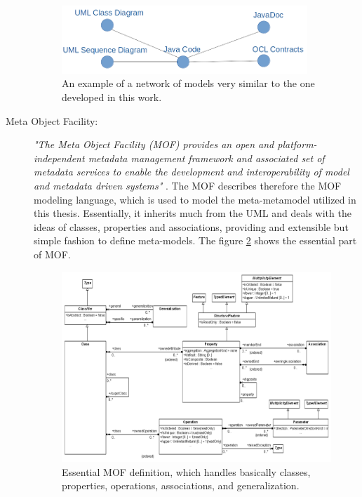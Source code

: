 \documentclass[tuberlin,cic,tc,english,noabntcite]{iiufrgs}
\begin{document}
\begin{description}
	\begin{figure}[h]
	    \caption{An example of a network of models very similar to the one developed in this work.}
	    \begin{center}
	        \includegraphics[width=25em]{network_example_01}   
	    \end{center}
	    \label{fig:network_example_01}
	\end{figure}

	\item[Meta Object Facility:] \emph{"The Meta Object Facility (MOF) provides an open and platform-independent metadata management framework and associated set of metadata services to enable the development and interoperability of model and metadata driven systems"} \citep{omg2015meta}. The MOF describes therefore the MOF modeling language, which is used to model the meta-metamodel utilized in this thesis. Essentially, it inherits much from the UML and deals with the ideas of classes, properties and associations, providing and extensible but simple fashion to define meta-models. The figure \ref{fig:emof_classes} shows the essential part of MOF.

	\begin{figure}[h]
	    \caption{Essential MOF definition, which handles basically classes, properties, operations, associations, and generalization.}
	    \begin{center}
	        \includegraphics[width=35em]{emof_classes}   
	    \end{center}
	    \label{fig:emof_classes}
	\end{figure}


\end{description}
\end{document}

